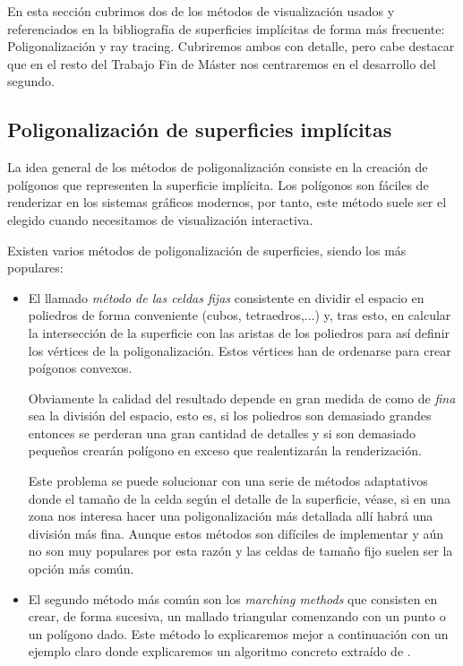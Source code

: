 En esta sección cubrimos dos de los métodos de visualización usados y referenciados en la bibliografía de superficies implícitas de forma más frecuente: Poligonalización y ray tracing. Cubriremos ambos con detalle, pero cabe destacar que en el resto del Trabajo Fin de Máster nos centraremos en el desarrollo del segundo.

\subsection{Poligonalización de superficies implícitas}

La idea general de los métodos de poligonalización consiste en la creación de polígonos que representen la superficie implícita. Los polígonos son fáciles de renderizar en los sistemas gráficos modernos, por tanto, este método suele ser el elegido cuando necesitamos de visualización interactiva.
\par Existen varios métodos  de poligonalización de superficies, siendo los más populares:

\begin{itemize}
	\item El llamado{ \em método de las celdas fijas}\cite{Bloomenthal90} consistente en dividir el espacio en poliedros de forma conveniente (cubos, tetraedros,...) y, tras esto, en calcular la intersección de la superficie con  las aristas de los poliedros para así definir los vértices de la poligonalización. Estos vértices han de ordenarse para crear poígonos convexos.
	\par Obviamente la calidad del resultado depende en gran medida de como de { \em fina} sea la división del espacio, esto es, si los poliedros son demasiado grandes entonces se perderan una gran cantidad de detalles y si son demasiado pequeños crearán polígono en exceso que realentizarán la renderización.
	\par Este problema se puede solucionar con una serie de métodos adaptativos donde el tamaño de la celda según el detalle de la superficie, véase, si en una zona nos interesa hacer una poligonalización más detallada allí habrá una división más fina. Aunque estos métodos son difíciles de implementar y aún no son muy populares por esta razón y las celdas de tamaño fijo suelen ser la opción más común.
	\item El segundo método más común son los{ \em marching methods} que consisten en crear, de forma sucesiva, un mallado triangular comenzando con un punto o un polígono dado. Este método lo explicaremos mejor a continuación con un ejemplo claro donde explicaremos un algoritmo concreto extraído de \cite{Hartmann03}.
\end{itemize}


